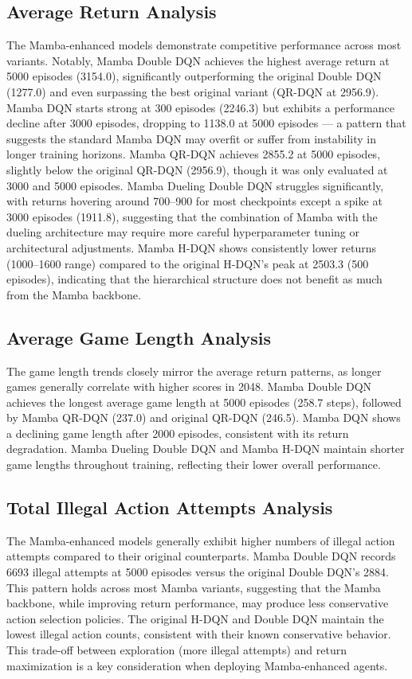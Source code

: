 \documentclass[conference]{IEEEtran}
\begin{document}
\subsection{Average Return Analysis}

The Mamba-enhanced models demonstrate competitive performance across most variants. Notably, Mamba Double DQN achieves the highest average return at 5000 episodes (3154.0), significantly outperforming the original Double DQN (1277.0) and even surpassing the best original variant (QR-DQN at 2956.9). Mamba DQN starts strong at 300 episodes (2246.3) but exhibits a performance decline after 3000 episodes, dropping to 1138.0 at 5000 episodes --- a pattern that suggests the standard Mamba DQN may overfit or suffer from instability in longer training horizons. Mamba QR-DQN achieves 2855.2 at 5000 episodes, slightly below the original QR-DQN (2956.9), though it was only evaluated at 3000 and 5000 episodes. Mamba Dueling Double DQN struggles significantly, with returns hovering around 700--900 for most checkpoints except a spike at 3000 episodes (1911.8), suggesting that the combination of Mamba with the dueling architecture may require more careful hyperparameter tuning or architectural adjustments. Mamba H-DQN shows consistently lower returns (1000--1600 range) compared to the original H-DQN's peak at 2503.3 (500 episodes), indicating that the hierarchical structure does not benefit as much from the Mamba backbone.

\subsection{Average Game Length Analysis}

The game length trends closely mirror the average return patterns, as longer games generally correlate with higher scores in 2048. Mamba Double DQN achieves the longest average game length at 5000 episodes (258.7 steps), followed by Mamba QR-DQN (237.0) and original QR-DQN (246.5). Mamba DQN shows a declining game length after 2000 episodes, consistent with its return degradation. Mamba Dueling Double DQN and Mamba H-DQN maintain shorter game lengths throughout training, reflecting their lower overall performance.

\subsection{Total Illegal Action Attempts Analysis}

The Mamba-enhanced models generally exhibit higher numbers of illegal action attempts compared to their original counterparts. Mamba Double DQN records 6693 illegal attempts at 5000 episodes versus the original Double DQN's 2884. This pattern holds across most Mamba variants, suggesting that the Mamba backbone, while improving return performance, may produce less conservative action selection policies. The original H-DQN and Double DQN maintain the lowest illegal action counts, consistent with their known conservative behavior. This trade-off between exploration (more illegal attempts) and return maximization is a key consideration when deploying Mamba-enhanced agents.
\end{document}
